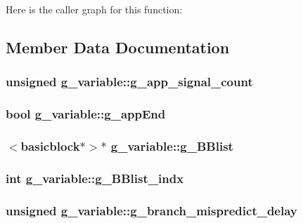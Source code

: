 Here is the caller graph for this function:




\subsection{Member Data Documentation}
\hypertarget{structg__variable_a8065e226bc2987122b831ffc1d58052a}{
\subsubsection[{g\_\-app\_\-signal\_\-count}]{\setlength{\rightskip}{0pt plus 5cm}unsigned {\bf g\_\-variable::g\_\-app\_\-signal\_\-count}}}
\label{structg__variable_a8065e226bc2987122b831ffc1d58052a}
\hypertarget{structg__variable_ac0ace8e752b855d8a33cd9c9a5d62511}{
\subsubsection[{g\_\-appEnd}]{\setlength{\rightskip}{0pt plus 5cm}bool {\bf g\_\-variable::g\_\-appEnd}}}
\label{structg__variable_ac0ace8e752b855d8a33cd9c9a5d62511}
\hypertarget{structg__variable_a1664c2b31146ab2b5f77464cd93f2cc8}{
\subsubsection[{g\_\-BBlist}]{$<${\bf basicblock}$\ast$$>$$\ast$ {\bf g\_\-variable::g\_\-BBlist}}}
\label{structg__variable_a1664c2b31146ab2b5f77464cd93f2cc8}
\hypertarget{structg__variable_a383af2308cefc8a72db47b1d7a41a702}{
\subsubsection[{g\_\-BBlist\_\-indx}]{\setlength{\rightskip}{0pt plus 5cm}int {\bf g\_\-variable::g\_\-BBlist\_\-indx}}}
\label{structg__variable_a383af2308cefc8a72db47b1d7a41a702}
\hypertarget{structg__variable_aa7d9d96654c800965904eab03e9fde48}{
\subsubsection[{g\_\-branch\_\-mispredict\_\-delay}]{\setlength{\rightskip}{0pt plus 5cm}unsigned {\bf g\_\-variable::g\_\-branch\_\-mispredict\_\-delay}}}

